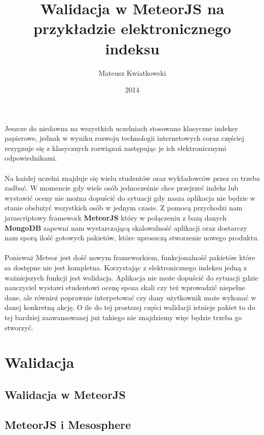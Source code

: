 \documentclass[brudnopis]{xmgr}
\author   {Mateusz Kwiatkowski}
\title    {Walidacja w MeteorJS na przykładzie elektronicznego indeksu}
\date     {2014}
\begin{document}
\begin{abstract}
\end{abstract}

\maketitle
%
\introduction

Jeszcze do niedawna na wszystkich uczelniach stosowano klasyczne indeksy
papierowe, jednak w wyniku rozwoju technologii internetowych coraz częściej
rezygnuje się z klasycznych rozwiązań zastępując je ich elektronicznymi odpowiednikami.
\\
\\
Na każdej uczelni znajduje się wielu studentów oraz wykładowców przez co trzeba zadbać. W momencie
gdy wiele osób jednocześnie chce przejrzeć indeks lub wystawić oceny nie można dopuścić do sytuacji gdy nasza
aplikacja nie będzie w stanie obsłużyć wszystkich osób w jednym czasie. Z pomocą przychodzi nam javascriptowy
framework \textbf{MeteorJS} który w połączeniu z bazą danych \textbf{MongoDB} zapewni nam wystarczającą skalowalność
aplikacji oraz dostarczy nam sporą ilość gotowych pakietów, które uproszczą stworzenie nowego produktu.
\\
\\
Ponieważ Meteor jest dość nowym frameworkiem, funkcjonalność pakietów które sa dostępne nie jest kompletna.
Korzystając z elektronicznego indeksu jedną z ważniejszych funkcji jest walidacja. Aplikacja nie może dopuścić do
sytuacji gdzie nauczyciel wystawi studentowi ocenę spoza skali czy też wprowadzić niepełne dane, ale również
poprawnie interpetować czy dany użytkownik może wykonać w danej konkretną akcję. O ile do tej prostszej części
walidacji istnieje pakiet to do tej bardziej zaawansowanej już takiego nie znajdziemy więc będzie trzeba go stworzyć.




\chapter{Walidacja}


    
\section{Walidacja w MeteorJS}

\section{MeteorJS i Mesosphere}
\end{document}
